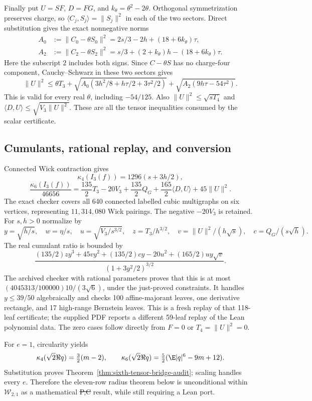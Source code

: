 Finally put $U=SF$, $D=FG$, and $k_\theta=\theta^2-2\theta$.
Orthogonal symmetrization preserves charge, so
$\langle C_j,S_j\rangle=\|S_j\|^2$ in each of the two sectors.
Direct substitution gives the exact nonnegative norms
\[
\begin{split}
 A_0&:=\|C_0-\theta S_0\|^2
      =2s/3-2h+(18+6k_\theta)\tau,\\
 A_2&:=\|C_2-\theta S_2\|^2
      =s/3+(2+k_\theta)h-(18+6k_\theta)\tau.
\end{split}
\]
Here the subscript $2$ includes both signs. Since $C-\theta S$ has
no charge-four component, Cauchy--Schwarz in these two sectors gives
\[
 \|U\|^2\le\theta T_3+
 \sqrt{A_0(3h^2/8+h\tau/2+3\tau^2/2)}+
 \sqrt{A_2(9h\tau-54\tau^2)}.
\]
This is valid for every real $\theta$, including $-54/125$.
Also $\|U\|^2\le\sqrt{sT_4}$ and
$\langle D,U\rangle\le\sqrt{V_3\|U\|^2}$.
These are all the tensor inequalities consumed by the scalar certificate.

\subsection{Cumulants, rational replay, and conversion}
Connected Wick contraction gives
\[
 \kappa_4(I_3(f))=1296(s+3h/2),
\]
\[
 \frac{\kappa_6(I_3(f))}{46656}
 =\frac{135}{2}T_3-20V_3+\frac{135}{2}Q_G
       +\frac{165}{2}\langle D,U\rangle+45\|U\|^2.
\]
The exact checker covers all 640 connected labelled cubic multigraphs
on six vertices, representing $11{,}314{,}080$ Wick pairings. The
negative $-20V_3$ is retained. For $s,h>0$ normalize by
\[
 y=\sqrt{h/s},\quad w=\eta/s,\quad
 u=\sqrt{V_3/s^{3/2}},\quad z=T_3/h^{3/2},\quad
 v=\|U\|^2/(h\sqrt s),\quad c=Q_G/(s\sqrt h).
\]
The real cumulant ratio is bounded by
\[
 \frac{(135/2)zy^3+45vy^2+(135/2)cy-20u^2
                 +(165/2)uy\sqrt v}{(1+3y^2/2)^{3/2}}.
\]
The archived checker with rational parameters
 proves that this is at most
$(4045313/100000)10/(3\sqrt6)$, under the just-proved constraints.
It handles $y\le39/50$ algebraically and checks 100 affine-majorant
leaves, one derivative rectangle, and 17 high-range Bernstein leaves.
This is a fresh replay of that 118-leaf certificate; the supplied PDF
reports a different 59-leaf replay of the Lean polynomial data.
The zero cases follow directly from $F=0$ or $T_4=\|U\|^2=0$.

For $e=1$, circularity yields
\[
 \kappa_4(\sqrt2\Re q)=\tfrac32(m-2),\qquad
 \kappa_6(\sqrt2\Re q)=\tfrac52(\E|q|^6-9m+12).
\]
Substitution proves Theorem~\ref{thm:sixth-tensor-bridge-audit}; scaling
handles every $e$. Therefore the eleven-row radius theorem below is
unconditional within $\mathcal W_{2,1}$ as a mathematical \st{P,C}
result, while still requiring a Lean port.

